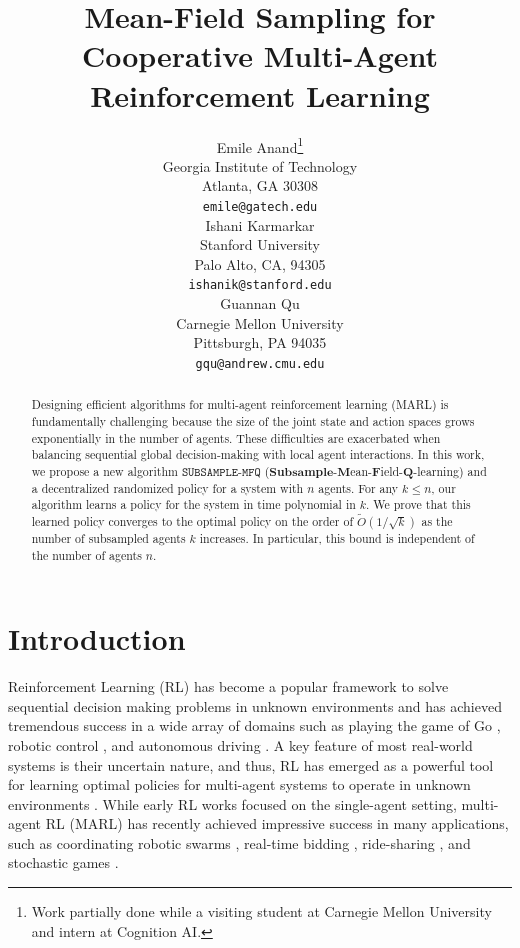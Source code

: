 \documentclass{article}
\title{Mean-Field Sampling for Cooperative Multi-Agent Reinforcement Learning}
\author{%
  Emile Anand\thanks{Work partially done while a visiting student at Carnegie Mellon University and intern at Cognition AI.}\\
  Georgia Institute of Technology\\
  Atlanta, GA 30308 \\
  \texttt{emile@gatech.edu} \\
  \And
  Ishani Karmarkar \\
  Stanford University \\ Palo Alto, CA, 94305\\
  \texttt{ishanik@stanford.edu} \\
  \AND
  Guannan Qu \\
  Carnegie Mellon University \\
  Pittsburgh, PA 94035 \\
  \texttt{gqu@andrew.cmu.edu}
}
\theoremstyle{plain}
\theoremstyle{definition}
\begin{document}
\maketitle


\begin{abstract}
Designing efficient algorithms for multi-agent reinforcement learning (MARL) is fundamentally challenging because the size of the joint state and action spaces grows exponentially in the number of agents. These difficulties are exacerbated when balancing sequential global decision-making with local agent interactions. In this work, we propose a new algorithm $\texttt{SUBSAMPLE-MFQ}$ ($\textbf{Subsample}$-$\textbf{M}$ean-$\textbf{F}$ield-$\textbf{Q}$-learning) and a decentralized randomized policy for a system with $n$ agents. For any $k\leq n$, our algorithm learns a policy for the system in time polynomial in $k$. We prove that this learned policy converges to the optimal policy on the order of $\tilde{O}(1/\sqrt{k})$ as the number of subsampled agents $k$ increases. In particular, this bound is independent of the number of agents $n$. 
\end{abstract}

\section{Introduction}


Reinforcement Learning (RL) has become a popular framework to solve sequential decision making problems in unknown environments and has achieved tremendous success in a wide array of domains such as playing the game of Go \citep{Silver_Huang_Maddison_Guez_Sifre_van_den_Driessche_Schrittwieser_Antonoglou_Panneershelvam_Lanctot_et_al._2016}, robotic control \citep{doi:10.1177/0278364913495721}, and autonomous driving \citep{9351818,lin2023online}. A key feature of most real-world systems is their uncertain nature, and thus, RL has emerged as a powerful tool for learning optimal policies for multi-agent systems to operate in unknown environments \citep{7438918,zhang2021multiagent,pmlr-v247-lin24a,anand2024efficient}. While early RL works focused on the single-agent setting, multi-agent RL (MARL) has recently achieved impressive success in many applications, such as coordinating robotic swarms \citep{7989376,deweese2024locally}, real-time bidding \citep{10.1145/3269206.3272021}, ride-sharing \citep{10.1145/3308558.3313433}, and stochastic games \citep{pmlr-v125-jin20a}.
\end{document}
